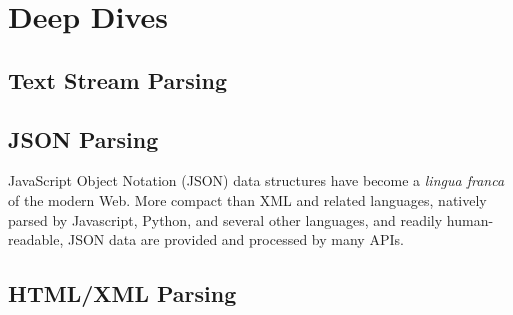 \section{Deep Dives}

\subsection{Text Stream Parsing}

\subsection{JSON Parsing}

JavaScript Object Notation (JSON) data structures have become a \emph{lingua franca} of the modern Web.  More compact than XML and related languages, natively parsed by Javascript, Python, and several other languages, and readily human-readable, JSON data are provided and processed by many APIs.



\subsection{HTML/XML Parsing}
